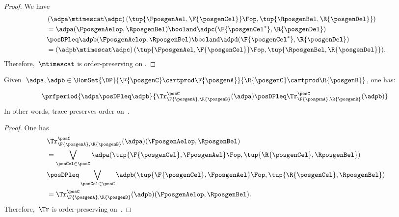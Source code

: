 \begin{proof}
    We have
    \begin{equation}
        \label{eq:tens_pres_ord}
        \begin{aligned}
            ~ & \left( \adpa\mtimescat \adpc\right) (\tup{\FposgenAel,\F{\posgenCel}}\Fop,\tup{\RposgenBel,\R{\posgenDel}})\\
              & = \adpa(\FposgenAelop,\RposgenBel)\booland \adpc(\F{\posgenCel^*},\R{\posgenDel})\\
              & \posDPleq \adpb(\FposgenAelop,\RposgenBel)\booland \adpd(\F{\posgenCel^*},\R{\posgenDel})\\
              & =\left( \adpb\mtimescat \adpc\right) (\tup{\FposgenAel,\F{\posgenCel}}\Fop,\tup{\RposgenBel,\R{\posgenDel}}).
        \end{aligned}
    \end{equation}
    Therefore,~$\mtimescat$ is order-preserving on \DP.
\end{proof}

\begin{lemma}
    \label{lem:trace_pres_order}
    Given~$\adpa,\adpb\in \HomSet{\DP}{\F{\posgenC}\cartprod \F{\posgenA}}{\R{\posgenC}\cartprod \R{\posgenB}}$, one has:

    \begin{equation}
        \prfperiod{\adpa\posDPleq \adpb}{\Tr_{\F{\posgenA},\R{\posgenB}}^\posC(\adpa)\posDPleq \Tr_{\F{\posgenA},\R{\posgenB}}^\posC(\adpb)}
    \end{equation}
    In other words, trace preserves order on~\DP.
\end{lemma}

\begin{proof}
    One has
    \begin{equation}
        \label{eq:trace_pres_ord}
        \begin{aligned}
            ~ & \Tr_{\F{\posgenA},\R{\posgenB}}^\posC(\adpa)(\FposgenAelop,\RposgenBel)\\
              & = \bigvee_{\posCel\in \posC}\adpa(\tup{\F{\posgenCel},\FposgenAel}\Fop,\tup{\R{\posgenCel},\RposgenBel})\\
              & \posDPleq \bigvee_{\posCel\in \posC}\adpb(\tup{\F{\posgenCel},\FposgenAel}\Fop,\tup{\R{\posgenCel},\RposgenBel}) \\
              & =\Tr_{\F{\posgenA},\R{\posgenB}}^\posC(\adpb)(\FposgenAelop,\RposgenBel).
        \end{aligned}
    \end{equation}
    Therefore,~$\Tr$ is order-preserving on~\DP.
\end{proof}

